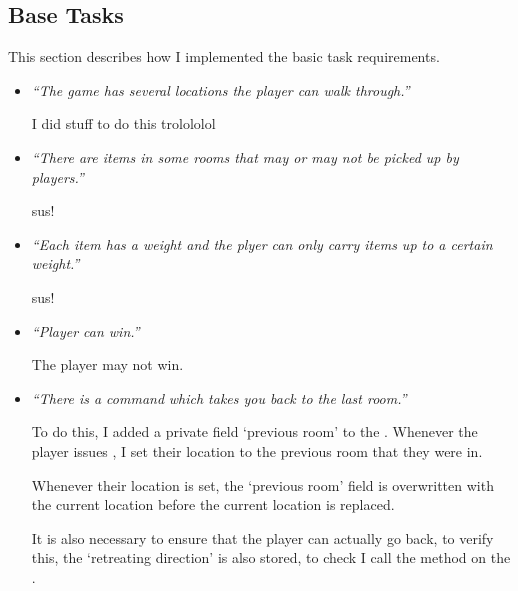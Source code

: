 \documentclass{article}
\begin{document}
\begin{multicols}{2}

        \section{Base Tasks}

            This section describes how I implemented the basic task requirements.

            \begin{itemize}[leftmargin=*]
                \item \textit{``The game has several locations the player can walk through.''}
                
                    I did stuff to do this trolololol

                \item \textit{``There are items in some rooms that may or may not be picked up by players.''}
                
                    sus!
                
                \item \textit{``Each item has a weight and the plyer can only carry items up to a certain weight.''}
                
                    sus!
                
                \item \textit{``Player can win.''}
                
                    The player may not win.

                \item \textit{``There is a command}  \textit{which takes you back to the last room.''}
                
                    To do this, I added a private field `previous room' to the . Whenever the player issues , I set their location to the previous room that they were in.
                    
                    Whenever their location is set, the `previous room' field is overwritten with the current location before the current location is replaced.

                    It is also necessary to ensure that the player can actually go back, to verify this, the `retreating direction' is also stored, to check I call the method  on the .


\end{itemize}
\end{multicols}
\end{document}
